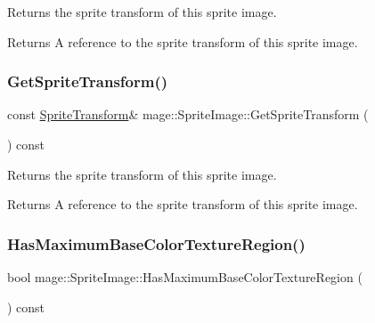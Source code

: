 Returns the sprite transform of this sprite image.

\begin{DoxyReturn}{Returns}
A reference to the sprite transform of this sprite image. 
\end{DoxyReturn}
\hypertarget{classmage_1_1_sprite_image_a109a0bd7938b91944b42a2969bb9bdf7}{}\label{classmage_1_1_sprite_image_a109a0bd7938b91944b42a2969bb9bdf7} 
\subsubsection{\texorpdfstring{Get\+Sprite\+Transform()}{GetSpriteTransform()}\hspace{0.1cm}{\footnotesize\ttfamily [2/2]}}
{\footnotesize\ttfamily const \hyperlink{classmage_1_1_sprite_transform}{Sprite\+Transform}\& mage\+::\+Sprite\+Image\+::\+Get\+Sprite\+Transform (\begin{DoxyParamCaption}{ }\end{DoxyParamCaption}) const\hspace{0.3cm}{\ttfamily [noexcept]}}

Returns the sprite transform of this sprite image.

\begin{DoxyReturn}{Returns}
A reference to the sprite transform of this sprite image. 
\end{DoxyReturn}
\hypertarget{classmage_1_1_sprite_image_a6d1267ebb8010e38875a717bd8339c3d}{}\label{classmage_1_1_sprite_image_a6d1267ebb8010e38875a717bd8339c3d} 
\subsubsection{\texorpdfstring{Has\+Maximum\+Base\+Color\+Texture\+Region()}{HasMaximumBaseColorTextureRegion()}}
{\footnotesize\ttfamily bool mage\+::\+Sprite\+Image\+::\+Has\+Maximum\+Base\+Color\+Texture\+Region (\begin{DoxyParamCaption}{ }\end{DoxyParamCaption}) const\hspace{0.3cm}{\ttfamily [noexcept]}}

